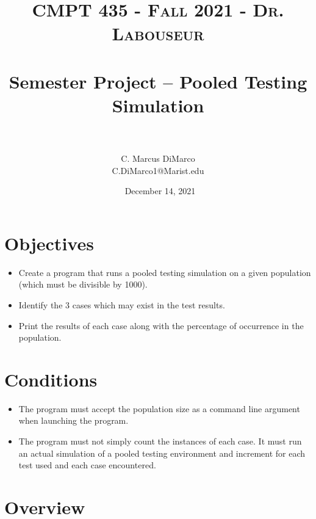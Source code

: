 \documentclass[letterpaper, 10pt]{article}
\title{	
   \normalfont \normalsize 
   \textsc{CMPT 435 - Fall 2021 - Dr. Labouseur} \\[10pt] %
   \horrule{0.5pt} \\[0.25cm] 	%
   \huge Semester Project -- Pooled Testing Simulation \\     	    %
   \horrule{0.5pt} \\[0.25cm] 	%
}
\author{C. Marcus DiMarco \\ \normalsize C.DiMarco1@Marist.edu}
\date{\normalsize\ December 14, 2021} 	%
\begin{document}
\maketitle %



\section{Objectives}

\begin{itemize}
    \item \hspace{0.5em}Create a program that runs a pooled testing simulation on a given population (which must be divisible by 1000).
    \item \hspace{0.5em}Identify the 3 cases which may exist in the test results.
    \item \hspace{0.5em}Print the results of each case along with the percentage of occurrence in the population.
\end{itemize}

\vspace{1.0em}

\section{Conditions}

\begin{itemize}
    \item \hspace{0.5em}The program must accept the population size as a command line argument when launching the program.
    \item \hspace{0.5em}The program must not simply count the instances of each case. It must run an actual simulation of a pooled testing environment and increment for each test used and each case encountered.
\end{itemize}

\section{Overview}
\end{document}
